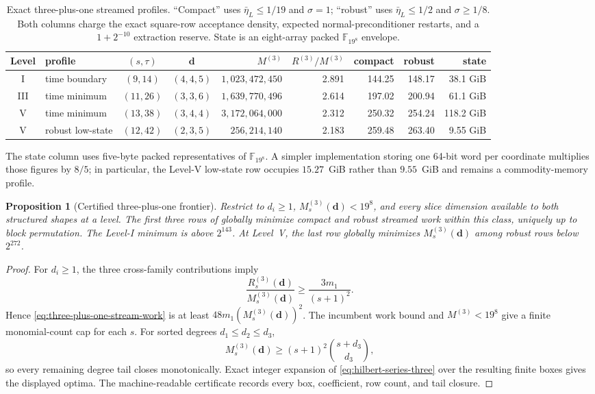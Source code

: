 \documentclass[11pt]{article}
\newtheorem{proposition}[proposition]{Proposition}
\newcommand{\F}{\mathbb F}
\begin{document}
\begin{table}[H]
\centering
\caption{Exact three-plus-one streamed profiles.  ``Compact'' uses
$\bar\eta_L\le1/19$ and $\sigma=1$; ``robust'' uses
$\bar\eta_L\le1/2$ and $\sigma\ge1/8$.  Both columns charge the exact
square-row acceptance density, expected normal-preconditioner restarts, and a
$1+2^{-10}$ extraction reserve.  State is an eight-array packed
$\F_{19^8}$ envelope.}
\label{tab:three-plus-one}
\scriptsize
\setlength{\tabcolsep}{2.8pt}
\begin{tabular}{@{}c l c c r r r r r@{}}
\toprule
Level & profile & $(s,\tau)$ & $\mathbf d$ & $M^{(3)}$ & $R^{(3)}/M^{(3)}$ & compact & robust & state\\
\midrule
I   & time boundary & $(9,14)$  & $(4,4,5)$ & $1{,}023{,}472{,}450$ & 2.891 & 144.25 & 148.17 & 38.1 GiB\\
III & time minimum  & $(11,26)$ & $(3,3,6)$ & $1{,}639{,}770{,}496$ & 2.614 & 197.02 & 200.94 & 61.1 GiB\\
V   & time minimum  & $(13,38)$ & $(3,4,4)$ & $3{,}172{,}064{,}000$ & 2.312 & 250.32 & 254.24 & 118.2 GiB\\
V   & robust low-state & $(12,42)$ & $(2,3,5)$ & $256{,}214{,}140$ & 2.183 & 259.48 & 263.40 & 9.55 GiB\\
\bottomrule
\end{tabular}
\end{table}

The state column uses five-byte packed representatives of $\F_{19^8}$.  A
simpler implementation storing one 64-bit word per coordinate multiplies those
figures by $8/5$; in particular, the Level-V low-state row occupies
$15.27$~GiB rather than $9.55$~GiB and remains a commodity-memory profile.

\begin{proposition}[Certified three-plus-one frontier]
\label{prop:three-plus-one-frontier}
Restrict to $d_i\ge1$, $M^{(3)}_s(\mathbf d)<19^8$, and every slice dimension
available to both structured shapes at a level.  The first three rows of
 globally minimize compact and robust streamed work
within this class, uniquely up to block permutation.  The Level-I minimum is
above $2^{143}$.  At Level~V, the last row globally minimizes
$M^{(3)}_s(\mathbf d)$ among robust rows below $2^{272}$.
\end{proposition}

\begin{proof}
For $d_i\ge1$, the three cross-family contributions imply
\[
 \frac{R^{(3)}_s(\mathbf d)}{M^{(3)}_s(\mathbf d)}
 \ge \frac{3m_1}{(s+1)^2}.
\]
Hence \eqref{eq:three-plus-one-stream-work} is at least
$48m_1(M^{(3)}_s(\mathbf d))^2$.  The incumbent work bound and
$M^{(3)}<19^8$ give a finite monomial-count cap for each $s$.  For sorted
degrees $d_1\le d_2\le d_3$,
\[
 M^{(3)}_s(\mathbf d)
 \ge (s+1)^2\binom{s+d_3}{d_3},
\]
so every remaining degree tail closes monotonically.  Exact integer expansion
of \eqref{eq:hilbert-series-three} over the resulting finite boxes gives the
displayed optima.  The machine-readable certificate records every box,
coefficient, row count, and tail closure.
\end{proof}
\end{document}
